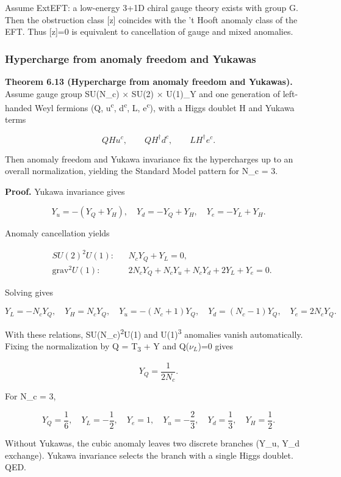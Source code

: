 \documentclass[11pt,a4paper]{article}
\theoremstyle{remark}
\begin{document}
Assume ExtEFT: a low-energy 3+1D chiral gauge theory exists with group G.
Then the obstruction class {[}z{]} coincides with the 't Hooft anomaly class of
the EFT. Thus {[}z{]}=0 is equivalent to cancellation of gauge and mixed
anomalies.

\subsubsection{Hypercharge from anomaly freedom and Yukawas}\label{hypercharge-from-anomaly-freedom-and-yukawas}

\textbf{Theorem 6.13 (Hypercharge from anomaly freedom and Yukawas).} Assume gauge
group SU(N\_c) \ensuremath{\times} SU(2) \ensuremath{\times} U(1)\_Y and one generation of left-handed Weyl
fermions (Q, u\textsuperscript{c}, d\textsuperscript{c}, L, e\textsuperscript{c}), with a Higgs doublet H and Yukawa terms

\[
Q H u^c,\qquad Q H^\dagger d^c,\qquad L H^\dagger e^c.
\]

Then anomaly freedom and Yukawa invariance fix the hypercharges up to an
overall normalization, yielding the Standard Model pattern for N\_c = 3.

\textbf{Proof.} Yukawa invariance gives

\[
Y_u = -(Y_Q + Y_H),\quad
Y_d = -Y_Q + Y_H,\quad
Y_e = -Y_L + Y_H.
\]

Anomaly cancellation yields

\[
\begin{aligned}
&SU(2)^2 U(1): && N_c Y_Q + Y_L = 0,\\
&\mathrm{grav}^2 U(1): && 2 N_c Y_Q + N_c Y_u + N_c Y_d + 2 Y_L + Y_e = 0.
\end{aligned}
\]

Solving gives

\[
Y_L = -N_c Y_Q,\quad
Y_H = N_c Y_Q,\quad
Y_u = -(N_c + 1) Y_Q,\quad
Y_d = (N_c - 1) Y_Q,\quad
Y_e = 2 N_c Y_Q.
\]

With these relations, SU(N\_c)\textsuperscript{2}U(1) and U(1)\textsuperscript{3} anomalies vanish
automatically. Fixing the normalization by Q = T\textsubscript{3} + Y and Q(\(\nu_L\))=0 gives

\[
Y_Q = \frac{1}{2 N_c}.
\]

For N\_c = 3,

\[
Y_Q = \frac{1}{6},\quad Y_L = -\frac{1}{2},\quad Y_e = 1,\quad
Y_u = -\frac{2}{3},\quad Y_d = \frac{1}{3},\quad Y_H = \frac{1}{2}.
\]

Without Yukawas, the cubic anomaly leaves two discrete branches (Y\_u, Y\_d
exchange). Yukawa invariance selects the branch with a single Higgs doublet.
QED.
\end{document}
